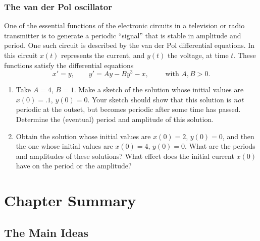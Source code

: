 \subsubsection{The van der Pol oscillator}
\label{subsubsec:the-van-der-pol-oscillator}

One of the essential functions of the electronic circuits in a
television or radio transmitter is to generate a periodic ``signal''
that is stable in amplitude and period.  One such circuit is described
by the van der Pol differential equations.  In this circuit $x(t)$
represents the current, and $y(t)$ the voltage, at time $t$.  These
functions satisfy the differential equations
	\[
x' = y,  \qquad y' = Ay - By^3 - x, \qquad \mbox{ with $A, B > 0$}.
\]


\begin{enumerate}
\item Take $A = 4$, $B = 1$.  Make a sketch of the solution whose
initial values are $x(0) = .1$, $y(0) = 0$.  Your sketch should show
that this solution is {\em not\/} periodic at the outset, but becomes
periodic after some time has passed.  Determine the (eventual) period
and amplitude of this solution.


\item Obtain the solution whose initial values are $x(0) = 2$, $y(0) =
0$, and then the one whose initial values are $x(0) = 4$, $y(0) = 0$.
What are the periods and amplitudes of these solutions?  What effect
does the initial current $x(0)$ have on the period or the amplitude?



\end{enumerate}
\section{Chapter Summary}
\label{sec:chapter-summary}

\subsection{The Main Ideas}
\label{subsec:the-main-ideas}


